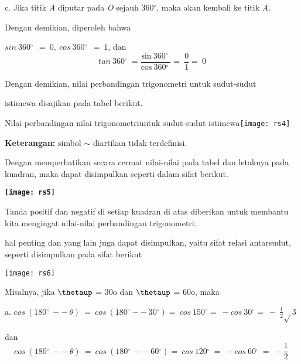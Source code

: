 \documentclass[11pt,fleqn]{book} %
\begin{document}
\begin{myEnumerate}
\begin{itemize}
\noindent 

\noindent c. Jika titik \textit{A }diputar pada \textit{O }sejauh 360${}^\circ $, maka akan kembali ke titik \textit{A}.

\noindent Dengan demikian, diperoleh bahwa

\noindent $sin\ 360{}^\circ \ \ =\ 0,\ cos\ 360{}^\circ \ \ =\ 1$, dan
\[tan\ 360{}^\circ \ \mathrm{=} \frac{\mathrm{sin\ 360}{}^\circ \ }{\mathrm{cos\ 360}{}^\circ \ }\mathrm{=\ }\frac{0}{\mathrm{1}}\mathrm{=\ 0}\] 


\noindent Dengan demikian, nilai perbandingan trigonometri untuk sudut-sudut

\noindent istimewa disajikan pada tabel berikut.

\noindent 

\noindent Nilai perbandingan nilai trigonometriuntuk sudut-sudut istimewa\texttt{[image: rs4]}

\noindent \textbf{Keterangan: }simbol $\sim$ diartikan tidak terdefinisi.

\noindent 

\noindent Dengan memperhatikan secara cermat nilai-nilai pada tabel dan letaknya pada kuadran, maka dapat disimpulkan seperti dalam sifat berikut.

\noindent \textbf{}

\noindent \textbf{\texttt{[image: rs5]}}

\noindent 

\noindent Tanda positif dan negatif di setiap kuadran di atas diberikan untuk membantu kita mengingat nilai-nilai perbandingan trigonometri.

\noindent hal penting dan yang lain juga dapat disimpulkan, yaitu sifat relasi antarsudut, seperti disimpulkan pada sifat berikut

\noindent 

\noindent \texttt{[image: rs6]}

\noindent 

\noindent Misalnya, jika $\thetaup$ = 30o dan $\thetaup$ = 60o, maka

\noindent a. $cos\ (180{}^\circ \ --\ \theta )\ =\ cos\ (180{}^\circ --\ 30{}^\circ )=\ cos\ 150{}^\circ =\ -cos\ 30{}^\circ =\ -\ \frac{1}{\mathrm{2}}\mathrm{\sqrt{}}\mathrm{3}$ 

\noindent dan
\[cos\ (180{}^\circ \ --\ \theta )\ =\ cos\ (180{}^\circ \ --\ 60{}^\circ )=\ cos\ 120{}^\circ \ =\ -cos\ 60{}^\circ \ =\ -\frac{1}{\mathrm{2}}\ \] 



\end{itemize}
\end{myEnumerate}
\end{document}
